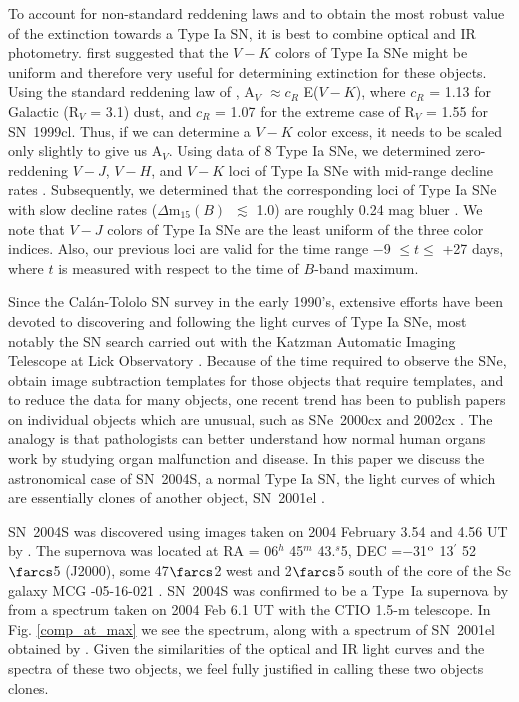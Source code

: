 \documentclass[12pt,preprint,psfig,epsf]{aastex}
\newcommand{\dmm}{\mbox{$\Delta$m$_{15}(B)$}}
\begin{document}
To account for non-standard reddening laws and to obtain the most robust
value of the extinction towards a Type Ia SN, it is best to combine optical
and IR photometry.  \citet{Eli_etal85} first suggested that the $V-K$ colors
of Type Ia SNe might be uniform and therefore very useful for determining
extinction for these objects. Using the standard reddening law of
\citet{Car_etal89}, A$_V$ $\approx c_R$ E($V-K$), where $c_R$ = 1.13 for
Galactic (R$_V$ = 3.1) dust, and $c_R$ = 1.07 for the extreme case of
R$_V$ = 1.55 for SN~1999cl.  Thus, if we can determine a
$V-K$ color excess, it needs to be scaled only slightly to give us A$_V$.
Using data of 8 Type Ia SNe, we determined zero-reddening $V-J$, $V-H$, and $V-K$
loci of Type Ia SNe with mid-range decline rates \citep{Kri_etal00}.  
Subsequently, we determined that the corresponding loci of Type Ia SNe with
slow decline rates (\dmm\ $\lesssim$ 1.0) are roughly 0.24 mag bluer
\citep{Kri_etal04b}. We note that $V-J$ colors of Type Ia SNe are the least
uniform of the three color indices.  Also, our previous loci are valid for
the time range $-$9 $\leq t \leq$ +27 days, where $t$ is measured with
respect to the time of $B$-band maximum.

Since the Cal\'{a}n-Tololo SN survey in the early 1990's, extensive efforts
have been devoted to discovering and following the light curves of Type Ia
SNe, most notably the SN search carried out with the Katzman Automatic
Imaging Telescope at Lick Observatory \citep{Fil_etal01}. Because of
the time required to observe the SNe, obtain image subtraction templates for
those objects that require templates, and to reduce the data for many
objects, one recent trend has been to publish papers on individual objects
which are unusual, such as SNe~2000cx \citep{Li_etal01,Can_etal03} and
2002cx \citep{Li_etal03}.  The analogy is that pathologists can better
understand how normal human organs work by studying organ malfunction and
disease.  In this paper we discuss the astronomical case of SN~2004S, a
normal Type Ia SN, the light curves of which are essentially clones of another
object, SN~2001el \citep{Kri_etal03}.

SN~2004S was discovered using images taken on 2004 February 3.54 and 4.56 UT by
\citet{Mar04}.  The supernova was located at RA = 06$^h$ 45$^m$
43.\hspace{-1.3mm}$^s$5, DEC =$-$31$^{\rm o}$ 13$^{\prime}$ 52$\farcs$5
(J2000), some 47$\farcs$2 west and 2$\farcs$5 south of the core of the Sc
galaxy MCG -05-16-021 \citep{Big04}. SN~2004S was confirmed to be a Type~Ia
supernova by \citet{Sun_etal04} from a spectrum taken on 2004 Feb 6.1 UT with
the CTIO 1.5-m telescope.  In Fig. \ref{comp_at_max} we see the
\citet{Sun_etal04} spectrum, along with a spectrum of SN~2001el obtained by
\citet{Wan_etal03b}. Given the similarities of the optical and IR light curves
and the spectra of these two objects, we feel fully justified in calling these
two objects clones.
\end{document}
